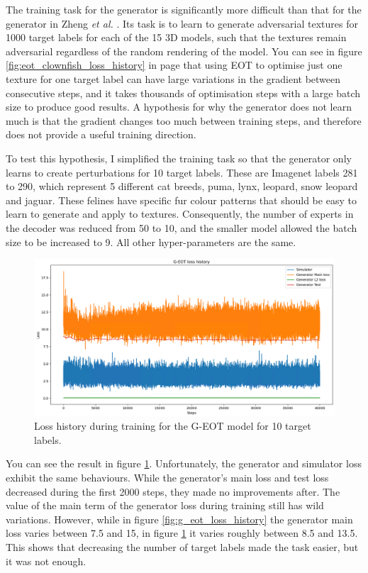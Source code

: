 The training task for the generator is significantly more difficult than that for the generator in Zheng \textit{et al.} \cite{zheng_black_box_GAN}. Its task is to learn to generate adversarial textures for 1000 target labels for each of the 15 3D models, such that the textures remain adversarial regardless of the random rendering of the model. You can see in figure \ref{fig:eot_clownfish_loss_history} in page \pageref{fig:eot_clownfish_loss_history} that using EOT to optimise just one texture for one target label can have large variations in the gradient between consecutive steps, and it takes thousands of optimisation steps with a large batch size to produce good results. A hypothesis for why the generator does not learn much is that the gradient changes too much between training steps, and therefore does not provide a useful training direction.

To test this hypothesis, I simplified the training task so that the generator only learns to create perturbations for 10 target labels. These are Imagenet labels 281 to 290, which represent 5 different cat breeds, puma, lynx, leopard, snow leopard and jaguar. These felines have specific fur colour patterns that should be easy to learn to generate and apply to textures. Consequently, the number of experts in the decoder was reduced from 50 to 10, and the smaller model allowed the batch size to be increased to 9. All other hyper-parameters are the same.

\begin{figure}[ht]
    \centering
    \includegraphics[width=1\textwidth]{graphics/g_eot_loss_exp2.PNG}
    \caption{Loss history during training for the G-EOT model for 10 target labels.}
    \label{fig:g_eot_loss_exp2}
\end{figure}

You can see the result in figure \ref{fig:g_eot_loss_exp2}. Unfortunately, the generator and simulator loss exhibit the same behaviours. While the generator's main loss and test loss decreased during the first 2000 steps, they made no improvements after. The value of the main term of the generator loss during training still has wild variations. However, while in figure \ref{fig:g_eot_loss_history} the generator main loss varies between 7.5 and 15, in figure \ref{fig:g_eot_loss_exp2} it varies roughly between 8.5 and 13.5. This shows that decreasing the number of target labels made the task easier, but it was not enough.
    
